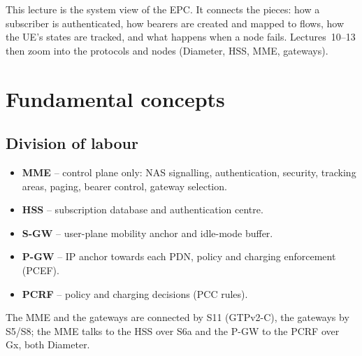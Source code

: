 \documentclass[11pt,a4paper]{article}
\begin{document}
This lecture is the system view of the EPC. It connects the pieces: how a subscriber is
authenticated, how bearers are created and mapped to flows, how the UE's states are tracked, and
what happens when a node fails. Lectures~10--13 then zoom into the protocols and nodes (Diameter,
HSS, MME, gateways).

\section{Fundamental concepts}

\subsection{Division of labour}
\begin{itemize}
  \item \textbf{MME} -- control plane only: NAS signalling, authentication, security, tracking areas,
        paging, bearer control, gateway selection.
  \item \textbf{HSS} -- subscription database and authentication centre.
  \item \textbf{S-GW} -- user-plane mobility anchor and idle-mode buffer.
  \item \textbf{P-GW} -- IP anchor towards each PDN, policy and charging enforcement (PCEF).
  \item \textbf{PCRF} -- policy and charging decisions (PCC rules).
\end{itemize}
The MME and the gateways are connected by S11 (GTPv2-C), the gateways by S5/S8; the MME talks to
the HSS over S6a and the P-GW to the PCRF over Gx, both Diameter.
\end{document}
